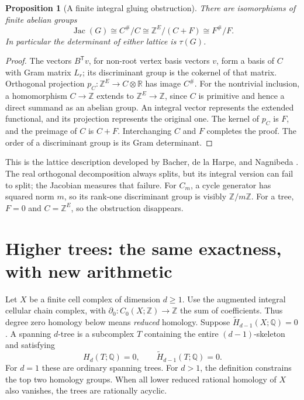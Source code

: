 \documentclass[11pt]{article}
\newtheorem{proposition}[theorem]{Proposition}
\theoremstyle{definition}
\theoremstyle{remark}
\newcommand{\Q}{\mathbb Q}
\newcommand{\Z}{\mathbb Z}
\newcommand{\R}{\mathbb R}
\begin{document}
\begin{proposition}[A finite integral gluing obstruction]
There are isomorphisms of finite abelian groups
\[
 \operatorname{Jac}(G)\cong C^\#/C
 \cong\Z^E/(C+F)\cong F^\#/F.
\]
In particular the determinant of either lattice is \(\tau(G)\).
\end{proposition}
\begin{proof}
The vectors \(B^{\mathsf T}v\), for non-root vertex basis vectors \(v\),
form a basis of \(C\) with Gram matrix \(L_r\); its discriminant group
is the cokernel of that matrix.  Orthogonal projection
\(p_C:\Z^E\to C\otimes\R\) has image \(C^\#\).  For the nontrivial
inclusion, a homomorphism \(C\to\Z\) extends to \(\Z^E\to\Z\), since
\(C\) is primitive and hence a direct summand as an abelian group.
An integral vector represents the extended functional, and its projection
represents the original one.  The kernel of \(p_C\) is \(F\), and the
preimage of \(C\) is \(C+F\).  Interchanging \(C\) and \(F\) completes
the proof.  The order of a discriminant group is its Gram determinant.
\end{proof}

This is the lattice description developed by Bacher, de la Harpe, and
Nagnibeda \cite{gih-bacher-lattices}.  The real orthogonal decomposition
always splits, but its integral version can fail to split; the Jacobian
measures that failure.  For \(C_m\), a cycle generator has squared norm
\(m\), so its rank-one discriminant group is visibly \(\Z/m\Z\).
For a tree, \(F=0\) and \(C=\Z^E\), so the obstruction disappears.

\section{Higher trees: the same exactness, with new arithmetic}
\label{sec:gih-higher}

Let \(X\) be a finite cell complex of dimension \(d\ge1\).  Use the
augmented integral cellular chain complex, with
\(\partial_0:C_0(X;\Z)\to\Z\) the sum of coefficients.  Thus degree
zero homology below means \emph{reduced} homology.  Suppose
\(\widetilde H_{d-1}(X;\Q)=0\).  A spanning \(d\)-tree is a subcomplex
\(T\) containing the entire \((d-1)\)-skeleton and satisfying
\[
 H_d(T;\Q)=0,\qquad\widetilde H_{d-1}(T;\Q)=0.
\]
For \(d=1\) these are ordinary spanning trees. For \(d>1\),
the definition constrains the top two homology groups. When all lower
reduced rational homology of \(X\) also vanishes, the trees are rationally acyclic.
\end{document}
